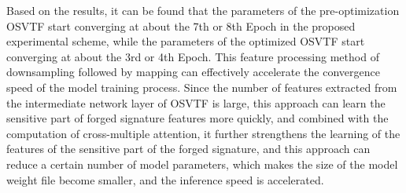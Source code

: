 Based on the results, it can be found that the parameters of the pre-optimization OSVTF start converging at about the 7th or 8th Epoch in the proposed experimental scheme, while the parameters of the optimized OSVTF start converging at about the 3rd or 4th Epoch. This feature processing method of downsampling followed by mapping can effectively accelerate the convergence speed of the model training process. Since the number of features extracted from the intermediate network layer of OSVTF is large, this approach can learn the sensitive part of forged signature features more quickly, and combined with the computation of cross-multiple attention, it further strengthens the learning of the features of the sensitive part of the forged signature, and this approach can reduce a certain number of model parameters, which makes the size of the model weight file become smaller, and the inference speed is accelerated.
